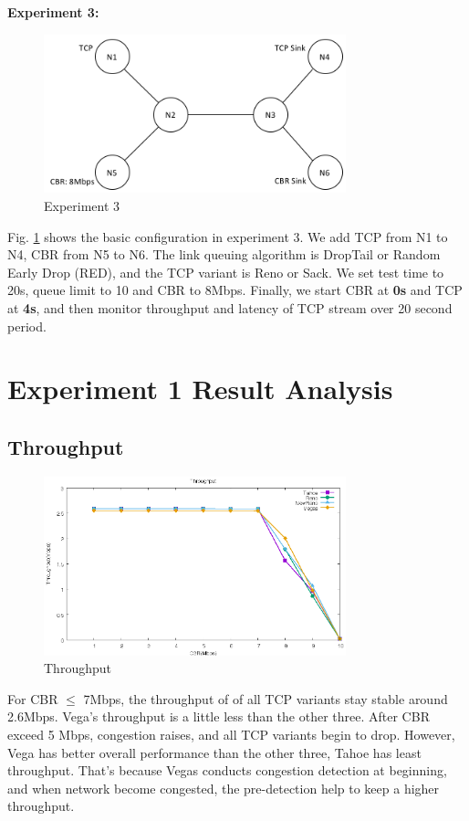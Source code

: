 \documentclass[10pt, conference]{IEEEtran}
\begin{document}
	\\\\
	\textbf{Experiment 3:}
	\begin{figure}[H]
		\centering
		\includegraphics[width=3.45in]{imgs/pic4.png}
		\caption[Optional caption]{Experiment 3}
		\label{fig:4}
	\end{figure}
	Fig. \ref{fig:4} shows the basic configuration in experiment 3. We add TCP from N1 to N4, CBR from N5 to N6. The link queuing algorithm is DropTail or Random Early Drop (RED), and the TCP variant is Reno or Sack. We set test time to 20s, queue limit to 10 and CBR to 8Mbps. Finally, we start CBR at \textbf{0s} and TCP at \textbf{4s}, and then monitor throughput and latency of TCP stream over 20 second period.
	
	\section{Experiment 1 Result Analysis}
	\subsection{Throughput}
	\begin{figure}[H]
		\centering
		\includegraphics[width=3.45in]{imgs/exp1_throughput.eps}
		\caption[Optional caption]{Throughput}
		\label{fig:5}
	\end{figure}
	For CBR $\le$ 7Mbps, the throughput of of all TCP variants stay stable around 2.6Mbps. Vega's throughput is a little less than the other three. After CBR exceed 5 Mbps, congestion raises, and all TCP variants begin to drop. However, Vega has better overall performance than the other three, Tahoe has least throughput. That's because Vegas conducts congestion detection at beginning, and when network become congested, the pre-detection help to keep a higher throughput.
\end{document}
